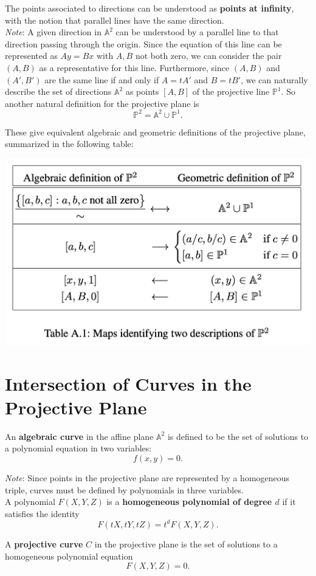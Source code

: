 \documentclass[11pt]{article}
\begin{document}
The points associated to directions can be understood as \textbf{points at infinity}, with the notion that parallel lines have the same direction. \\

\textit{Note}: A given direction in $\mathbb{A}^2$ can be understood by a parallel line to that direction passing through the origin. Since the equation of this line can be represented as $Ay = Bx$ with $A, B$ not both zero, we can consider the pair $(A, B)$ as a representative for this line. Furthermore, since $(A, B)$ and $(A', B')$ are the same line if and only if $A = tA'$ and $B = tB'$, we can naturally describe the set of directions $\mathbb{A}^2$ as points $[A, B]$ of the projective line $\mathbb{P}^1.$ So another natural definition for the projective plane is 
\[\mathbb{P}^2 = \mathbb{A}^2 \cup \mathbb{P}^1.\]

These give equivalent algebraic and geometric definitions of the projective plane, summarized in the following table:
\begin{center}
    \includegraphics[scale=0.5]{ProjectivePlaneDefinitions.png}
\end{center}

\section{Intersection of Curves in the Projective Plane}

\begin{definition} An \textbf{algebraic curve} in the affine plane $\mathbb{A}^2$ is defined to be the set of solutions
to a polynomial equation in two variables: \[ f(x, y) = 0.\]

\textit{Note}: Since points in the projective plane are represented by a homogeneous triple, curves must be defined by polynomials in three variables. \\

A polynomial $F(X, Y, Z)$ is a \textbf{homogeneous polynomial of degree $d$} if it satisfies the identity
\[ F(tX, tY, tZ) = t^d F(X, Y, Z).\]

A \textbf{projective curve} $C$ in the projective plane is the set of solutions to a homogeneous polynomial equation
\[ F(X, Y, Z) = 0.\]
\end{definition}
\end{document}
